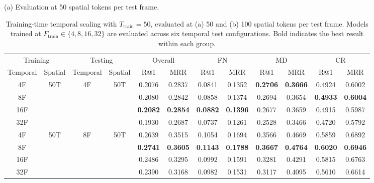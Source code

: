 \begin{table}[t]
    \centering
    \caption{Training-time temporal scaling with $T_{\text{train}}=50$, evaluated at (a) 50 and (b) 100 spatial tokens per test frame. Models trained at $F_{\text{train}} \in \{4, 8, 16, 32\}$ are evaluated across six temporal test configurations. Bold indicates the best result within each group.}
    \label{mglvr:tab:train_temporal_scaling}
    \footnotesize
    \renewcommand{\arraystretch}{0.78}
    (a) Evaluation at 50 spatial tokens per test frame.\par\smallskip
    \begin{tabular}{@{}c@{\hspace{3pt}}c@{\hspace{6pt}}c@{\hspace{3pt}}c@{\hspace{6pt}}*{7}{c@{\hspace{3pt}}}c@{}}
\toprule
\multicolumn{2}{c|}{Training} & \multicolumn{2}{c|}{Testing} & \multicolumn{2}{c|}{Overall} & \multicolumn{2}{c|}{FN} & \multicolumn{2}{c|}{MD} & \multicolumn{2}{c}{CR} \\
Temporal & Spatial & Temporal & Spatial & R@1   & MRR   & R@1   & MRR   & R@1   & MRR   & R@1   & MRR \\
\midrule
4F  & \multirow{4}{*}{50T} & \multirow{4}{*}{4F} & \multirow{4}{*}{50T} & 0.2076 & 0.2837 & 0.0841 & 0.1352 & \textbf{0.2706} & \textbf{0.3666} & 0.4924 & 0.6002 \\
8F  & & & & 0.2080 & 0.2842 & 0.0858 & 0.1374 & 0.2694 & 0.3654 & \textbf{0.4933} & \textbf{0.6004} \\
16F & & & & \textbf{0.2082} & \textbf{0.2854} & \textbf{0.0882} & \textbf{0.1396} & 0.2677 & 0.3659 & 0.4915 & 0.5987 \\
32F & & & & 0.1930 & 0.2687 & 0.0737 & 0.1261 & 0.2528 & 0.3466 & 0.4720 & 0.5792 \\
\midrule
4F  & \multirow{4}{*}{50T} & \multirow{4}{*}{8F} & \multirow{4}{*}{50T} & 0.2639 & 0.3515 & 0.1054 & 0.1694 & 0.3566 & 0.4669 & 0.5859 & 0.6892 \\
8F  & & & & \textbf{0.2741} & \textbf{0.3605} & \textbf{0.1143} & \textbf{0.1788} & \textbf{0.3667} & \textbf{0.4764} & \textbf{0.6020} & \textbf{0.6946} \\
16F & & & & 0.2486 & 0.3295 & 0.0992 & 0.1591 & 0.3281 & 0.4291 & 0.5815 & 0.6763 \\
32F & & & & 0.2390 & 0.3168 & 0.0982 & 0.1531 & 0.3117 & 0.4095 & 0.5610 & 0.6614 \\

\end{tabular}
\end{table}
